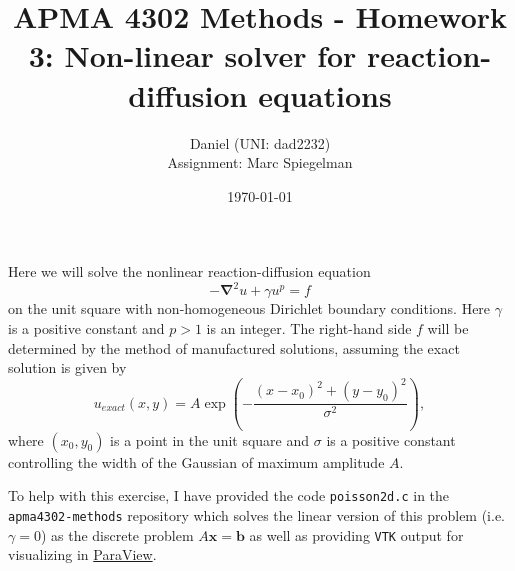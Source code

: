 \documentclass[11pt]{article}
\newcommand{\StudentName}{Daniel (UNI: dad2232)}
\begin{document}
\lstset{basicstyle=\ttfamily}

\title{APMA 4302 Methods - Homework 3: Non-linear solver for reaction-diffusion equations}
\author{\StudentName \\[0.5em]\small Assignment: Marc Spiegelman}
\date{\today}
\maketitle

Here we will solve the nonlinear reaction-diffusion equation
\begin{displaymath}
  -\mathbf{\nabla}^2 u + \gamma u^p = f
\end{displaymath}
on the unit square with  non-homogeneous Dirichlet boundary conditions. Here $\gamma$ is a positive constant and $p>1$ is an integer. The right-hand side $f$ will be determined by the method of manufactured solutions, assuming the exact solution is given by
\begin{displaymath}
  u_{exact}(x,y) = A \exp\left(-\frac{(x-x_0)^2+(y-y_0)^2}{\sigma^2}\right),
\end{displaymath}
where $(x_0,y_0)$ is a point in the unit square and $\sigma$ is a positive constant controlling the width of the Gaussian of maximum amplitude $A$.

To help with this exercise, I have provided the code \texttt{poisson2d.c} in the \texttt{apma4302-methods} repository which solves the linear version of this problem (i.e. $\gamma=0$) as the discrete problem $A\mathbf{x}=\mathbf{b}$ as well as providing \texttt{VTK} output for visualizing in \href{https://www.paraview.org/}{ParaView}.
\end{document}
